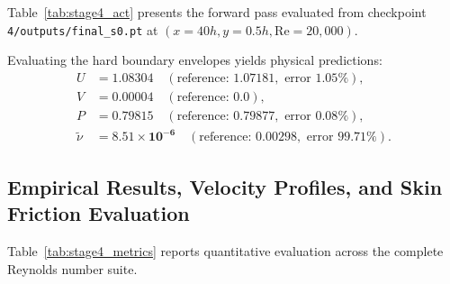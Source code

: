 \documentclass[11pt,a4paper]{article}
\begin{document}
Table~\ref{tab:stage4_act} presents the forward pass evaluated from checkpoint \texttt{4/outputs/final\_s0.pt} at $(x=40h, y=0.5h, \mathrm{Re}=20{,}000)$.
\begin{table}[H]
\centering
{}
\caption{Deterministic layer-by-layer forward pass evaluated at $(x=40h, y=0.5h, \mathrm{Re}=20{,}000)$. Normalized input vector: $[0.0000, 0.0000, 0.7585, -0.3333]^{\mathsf T}$. Checkpoint SHA256: \texttt{579b1eff68ca1791...}.}
\label{tab:stage4_act}
\end{table}
Evaluating the hard boundary envelopes yields physical predictions:
\begin{align}
U &= \mathbf{1.08304} \quad (\text{reference: } 1.07181, \text{ error } 1.05\%), \\
V &= 0.00004 \quad (\text{reference: } 0.0), \\
P &= \mathbf{0.79815} \quad (\text{reference: } 0.79877, \text{ error } 0.08\%), \\
\tilde{\nu} &= \mathbf{8.51\times 10^{-6}} \quad (\text{reference: } 0.00298, \text{ error } \mathbf{99.71\%}).
\end{align}

\subsection{Empirical Results, Velocity Profiles, and Skin Friction Evaluation}
Table~\ref{tab:stage4_metrics} reports quantitative evaluation across the complete Reynolds number suite.

\end{document}
